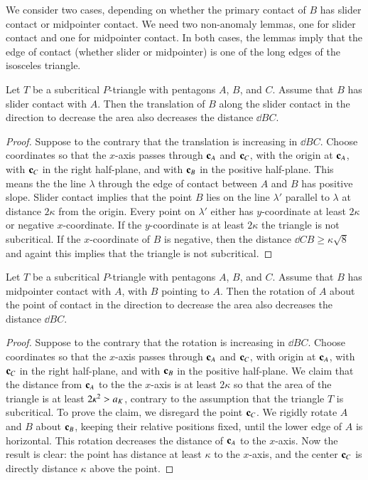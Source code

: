We consider two cases, depending on whether the primary contact of  $B$ has slider contact  or midpointer contact.  
We need two non-anomaly lemmas, one for slider contact and one for midpointer contact.  In both cases, the lemmas imply that the
edge of contact (whether slider or midpointer) is one of the long edges of the isosceles triangle.

\begin{lemma}  Let $T$ be a subcritical $P$-triangle with pentagons $A$, $B$, and $C$.  Assume that $B$ has slider
contact with $A$.  Then the translation of $B$ along the slider contact in the direction to decrease the area also decreases
the distance $\dd{B}{C}$.
\end{lemma}

\begin{proof} Suppose to the contrary that the translation is increasing in $\dd{B}{C}$.  Choose coordinates so that the $x$-axis
passes through ${\mathbf c}_A$ and ${\mathbf c}_C$, with the origin at ${\mathbf c}_A$, with  ${\mathbf c}_C$ in the right half-plane, and with ${\mathbf c}_B$ in the positive half-plane.
This means the the line $\lambda$ through the edge
of contact between $A$ and $B$ has positive slope.  Slider contact implies that 
the point $B$ lies on the line $\lambda'$ parallel to $\lambda$ at distance $2\kappa$ from the origin.
Every point on $\lambda'$ either has $y$-coordinate at least $2\kappa$ or negative $x$-coordinate.  If the $y$-coordinate
is at least $2\kappa$ the triangle is not subcritical.  If the $x$-coordinate of $B$ is negative, then the distance $\dd{C}{B} \ge\kappa\sqrt8$
and againt this implies that the triangle is not subcritical.
\end{proof}

\begin{lemma}  Let $T$ be a subcritical $P$-triangle with pentagons $A$, $B$, and $C$.  Assume that $B$ has midpointer
contact with $A$, with $B$ pointing to $A$.  Then the rotation of $A$ about the point of contact in the direction to decrease the area also decreases
the distance $\dd{B}{C}$.
\end{lemma}



\begin{proof} Suppose to the contrary that the rotation is increasing in $\dd{B}{C}$.  Choose coordinates so that the $x$-axis passes
through ${\mathbf c}_A$ and ${\mathbf c}_C$, with origin at ${\mathbf c}_A$, with ${\mathbf c}_C$ in the right half-plane, and with ${\mathbf c}_B$ in the positive half-plane.
We claim that the distance from ${\mathbf c}_A$ to the the $x$-axis is at least $2\kappa$ so that the area of the triangle is at least $2\kappa^2 > a_K$,
contrary to the assumption that the triangle $T$ is subcritical.   To prove the claim, we disregard the point ${\mathbf c}_C$.  We rigidly rotate
$A$ and $B$ about ${\mathbf c}_B$, keeping their relative positions fixed, until the lower edge of $A$ is horizontal.  This rotation decreases the
distance of ${\mathbf c}_A$ to the $x$-axis.  Now the result is clear: the point has distance at least $\kappa$ to the $x$-axis, and the center ${\mathbf c}_C$ is
directly distance $\kappa$ above the point.
\end{proof}

